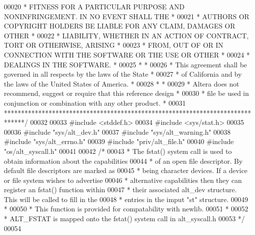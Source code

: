 \begin{DoxyCode}
00020 \textcolor{comment}{* FITNESS FOR A PARTICULAR PURPOSE AND NONINFRINGEMENT. IN NO EVENT SHALL THE *}
00021 \textcolor{comment}{* AUTHORS OR COPYRIGHT HOLDERS BE LIABLE FOR ANY CLAIM, DAMAGES OR OTHER      *}
00022 \textcolor{comment}{* LIABILITY, WHETHER IN AN ACTION OF CONTRACT, TORT OR OTHERWISE, ARISING     *}
00023 \textcolor{comment}{* FROM, OUT OF OR IN CONNECTION WITH THE SOFTWARE OR THE USE OR OTHER         *}
00024 \textcolor{comment}{* DEALINGS IN THE SOFTWARE.                                                   *}
00025 \textcolor{comment}{*                                                                             *}
00026 \textcolor{comment}{* This agreement shall be governed in all respects by the laws of the State   *}
00027 \textcolor{comment}{* of California and by the laws of the United States of America.              *}
00028 \textcolor{comment}{*                                                                             *}
00029 \textcolor{comment}{* Altera does not recommend, suggest or require that this reference design    *}
00030 \textcolor{comment}{* file be used in conjunction or combination with any other product.          *}
00031 \textcolor{comment}{******************************************************************************/}
00032 
00033 \textcolor{preprocessor}{#include <stddef.h>}
00034 \textcolor{preprocessor}{#include <sys/stat.h>}
00035 
00036 \textcolor{preprocessor}{#include "sys/alt_dev.h"}
00037 \textcolor{preprocessor}{#include "sys/alt_warning.h"}
00038 \textcolor{preprocessor}{#include "sys/alt_errno.h"}
00039 \textcolor{preprocessor}{#include "priv/alt_file.h"}
00040 \textcolor{preprocessor}{#include "os/alt_syscall.h"}
00041 
00042 \textcolor{comment}{/*}
00043 \textcolor{comment}{ * The fstat() system call is used to obtain information about the capabilities}
00044 \textcolor{comment}{ * of an open file descriptor. By default file descriptors are marked as }
00045 \textcolor{comment}{ * being character devices. If a device or file system wishes to advertise }
00046 \textcolor{comment}{ * alternative capabilities then they can register an fstat() function within}
00047 \textcolor{comment}{ * their associated alt\_dev structure. This will be called to fill in the}
00048 \textcolor{comment}{ * entries in the imput "st" structure.}
00049 \textcolor{comment}{ *}
00050 \textcolor{comment}{ * This function is provided for compatability with newlib. }
00051 \textcolor{comment}{ *}
00052 \textcolor{comment}{ * ALT\_FSTAT is mapped onto the fstat() system call in alt\_syscall.h}
00053 \textcolor{comment}{ */}
00054 

\end{DoxyCode}
